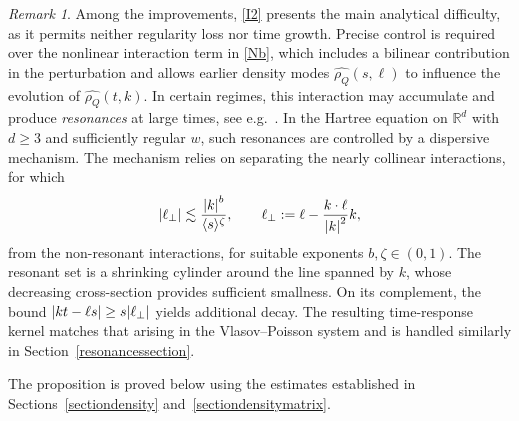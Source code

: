 \documentclass[10pt,a4paper]{amsart}
\providecommand{\eg}{e.g.\ }
\theoremstyle{plain}
\theoremstyle{remark}
\newtheorem{remark}[theorem]{Remark}
\newcommand{\ak}{\abs{k}}
\newcommand{\jb}[1]{\langle#1\rangle}
\newcommand{\R}{\mathbb{R}}
\begin{document}
\begin{remark}
Among the improvements, \eqref{I2} presents the main analytical difficulty, as it permits neither regularity loss nor time growth. Precise control is required over the nonlinear interaction term in \eqref{Nb}, which includes a bilinear contribution in the perturbation and allows earlier density modes $\widehat{\rho_Q}(s,\ell)$ to influence the evolution of $\widehat{\rho_Q}(t,k)$. In certain regimes, this interaction may accumulate and produce \textit{resonances} at large times, see \eg \cite{Bedrossian2021Echoes}. In the Hartree equation on $\R^d$ with $d\geq 3$ and sufficiently regular $w$, such resonances are controlled by a dispersive mechanism. The mechanism relies on separating the nearly collinear interactions, for which
\begin{align*}
\abs{\ell_\perp}\lesssim\frac{\ak^{b}}{\jb{s}^{\zeta}},\qquad \ell_\perp:=\ell-\frac{k\cdot\ell}{\ak^2}k,
\end{align*}
from the non-resonant interactions, for suitable exponents $b,\zeta\in(0,1)$. The resonant set is a shrinking cylinder around the line spanned by $k$, whose decreasing cross-section provides sufficient smallness. On its complement, the bound $\abs{kt-\ell s}\geq s\abs{\ell_\perp}$ yields additional decay. The resulting time-response kernel matches that arising in the Vlasov--Poisson system and is handled similarly in Section~\ref{resonancessection}.
\end{remark}

The proposition is proved below using the estimates established in Sections~\ref{sectiondensity} and~\ref{sectiondensitymatrix}.
\end{document}

